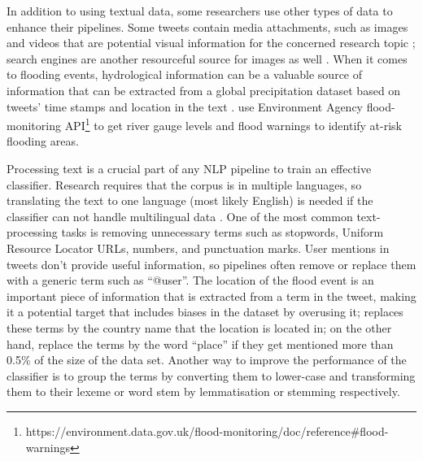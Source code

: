 In addition to using textual data, some researchers use other types of data to enhance their
pipelines. Some tweets contain media attachments, such as images and videos that are potential
visual information for the concerned research topic \cite{alamFloodDetectionTwitter2020}\cite{saidFloodsDetectionTwitter2020}\cite{ningPrototypingSocialMedia2020}; search engines are
another resourceful source for images as well \cite{fengExtractionPluvialFlood2018}. When it comes
to flooding events, hydrological information can be a valuable source of information that can be
extracted from a global precipitation dataset based on tweets' time stamps and location in the text
\cite{debruijnImprovingClassificationFlood2020}.
use Environment Agency flood-monitoring \ac{API}\footnote{https://environment.data.gov.uk/flood-monitoring/doc/reference\#flood-warnings} to get
river gauge levels and flood warnings to identify at-risk flooding areas.

Processing text is a crucial part of any \ac{NLP} pipeline to train an effective classifier.
Research requires that the corpus is in multiple languages, so translating the text to one language
(most likely English) is needed if the classifier can not handle multilingual data
\cite{singhEventClassificationLocation2019}. One of the most common text-processing tasks is
removing unnecessary terms such as stopwords, Uniform Resource Locator URLs, numbers, and
punctuation marks. User mentions in tweets don't provide useful information, so pipelines often
remove or replace them with a generic term such as
``@user''\cite{debruijnImprovingClassificationFlood2020}. The location of the flood event is an
important piece of information that is extracted from a term in the tweet, making it a potential
target that includes biases in the dataset by overusing it;
 replaces these terms by the country name that
the location is located in; on the other hand,
 replace the terms by the word ``place''
if they get mentioned more than 0.5\% of the size of the data set. Another way to improve the
performance of the classifier is to group the terms by converting them to lower-case and transforming
them to their lexeme or word stem by lemmatisation or stemming respectively.

